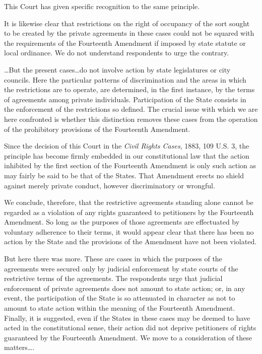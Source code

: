This Court has given specific recognition to the same principle.

It is likewise clear that restrictions on the right of occupancy of the sort
sought to be created by the private agreements in these cases could not be
squared with the requirements of the Fourteenth Amendment if imposed by state
statute or local ordinance. We do not understand respondents to urge the
contrary.

\ldots But the present cases\ldots do not involve action by state legislatures
or city councils. Here the particular patterns of discrimination and the areas
in which the restrictions are to operate, are determined, in the first instance,
by the terms of agreements among private individuals. Participation of the State
consists in the enforcement of the restrictions so defined. The crucial issue
with which we are here confronted is whether this distinction removes these
cases from the operation of the prohibitory provisions of the Fourteenth
Amendment.

Since the decision of this Court in the \emph{Civil Rights Cases}, 1883, 109
U.S. 3, the principle has become firmly embedded in
our constitutional law that the action inhibited by the first section of the
Fourteenth Amendment is only such action as may fairly be said to be that of the
States. That Amendment erects no shield against merely private conduct, however
discriminatory or wrongful.

We conclude, therefore, that the restrictive agreements standing alone cannot be
regarded as a violation of any rights guaranteed to petitioners by the
Fourteenth Amendment. So long as the purposes of those agreements are
effectuated by voluntary adherence to their terms, it would appear clear that
there has been no action by the State and the provisions of the Amendment have
not been violated.

But here there was more. These are cases in which the purposes of the agreements
were secured only by judicial enforcement by state courts of the restrictive
terms of the agreements. The respondents urge that judicial enforcement of
private agreements does not amount to state action; or, in any event, the
participation of the State is so attenuated in character as not to amount to
state action within the meaning of the Fourteenth Amendment. Finally, it is
suggested, even if the States in these cases may be deemed to have acted in the
constitutional sense, their action did not deprive petitioners of rights
guaranteed by the Fourteenth Amendment. We move to a consideration of these
matters\ldots .


